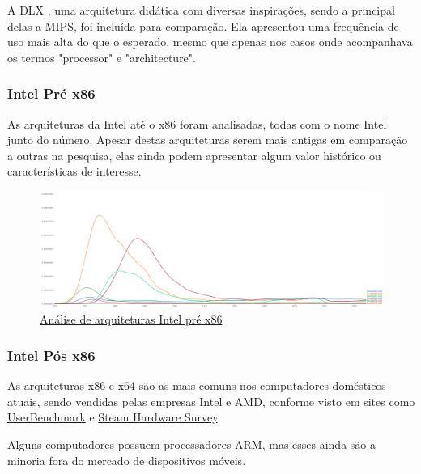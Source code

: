\documentclass[
	article,			%
	11pt,				%
	oneside,			%
	a4paper,			%
	english,			%
	brazil,				%
	sumario=tradicional
	]{abntex2}
\begin{document}
A DLX \cite{patterson_computer_1996}, uma arquitetura didática com diversas inspirações, sendo a principal delas a MIPS, foi incluída para comparação. Ela apresentou uma frequência de uso mais alta do que o esperado, mesmo que apenas nos casos onde acompanhava os termos "processor" e "architecture".

\subsubsection{Intel Pré x86}

As arquiteturas da Intel até o x86 foram analisadas, todas com o nome Intel junto do número. Apesar destas arquiteturas serem mais antigas em comparação a outras na pesquisa, elas ainda podem apresentar algum valor histórico ou características de interesse.

\begin{figure}[h]
    \centering
    \includegraphics[width=1\linewidth]{Ngrams/Intel_pre_86.png}
    \caption{\href{https://books.google.com/ngrams/graph?content=Intel\%204004\%2CIntel\%204040\%2CIntel\%208008\%2CIntel\%208080\%2CIntel\%208085\%2CIntel\%208086&year_start=1970&year_end=2022&corpus=en&smoothing=1&case_insensitive=true}{Análise de arquiteturas Intel pré x86}}
    \label{fig:NgramIntelPre86}
\end{figure}

\subsubsection{Intel Pós x86}

As arquiteturas x86 e x64 são as mais comuns nos computadores domésticos atuais, sendo vendidas pelas empresas Intel e AMD, conforme visto em sites como \href{https://cpu.userbenchmark.com/}{UserBenchmark} e \href{https://store.steampowered.com/hwsurvey/processormfg/}{Steam Hardware Survey}. 

Alguns computadores possuem processadores ARM, mas esses ainda são a minoria fora do mercado de dispositivos móveis.
\end{document}
